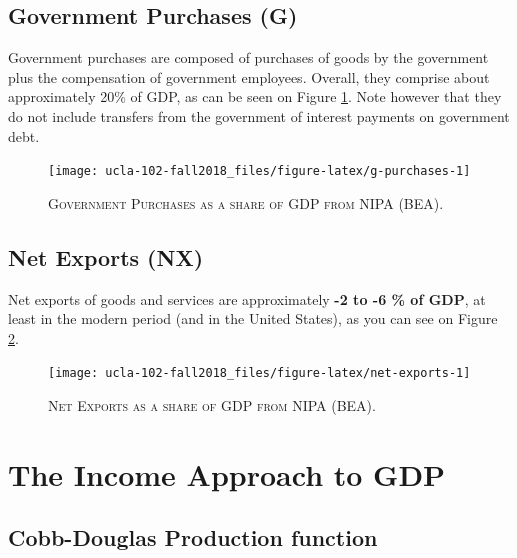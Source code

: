 \documentclass[]{book}
\theoremstyle{definition}
\theoremstyle{definition}
\theoremstyle{definition}
\theoremstyle{remark}
\begin{document}
\hypertarget{gov}{\subsection{Government Purchases (G)}\label{gov}}

Government purchases are composed of purchases of goods by the
government plus the compensation of government employees. Overall, they
comprise about approximately 20\% of GDP, as can be seen on Figure
\ref{fig:g-purchases}. Note however that they do not include transfers
from the government of interest payments on government debt.




\begin{figure}

{\centering \texttt{[image: ucla-102-fall2018\_files/figure-latex/g-purchases-1]} 

}

\caption{\textsc{Government Purchases as a share of GDP
from NIPA (BEA)}.}\label{fig:g-purchases}
\end{figure}

\hypertarget{net-exports}{\subsection{Net Exports
(NX)}\label{net-exports}}

Net exports of goods and services are approximately \textbf{-2 to -6 \%
of GDP}, at least in the modern period (and in the United States), as
you can see on Figure \ref{fig:net-exports}.




\begin{figure}

{\centering \texttt{[image: ucla-102-fall2018\_files/figure-latex/net-exports-1]} 

}

\caption{\textsc{Net Exports as a share of GDP from NIPA
(BEA)}.}\label{fig:net-exports}
\end{figure}

\hypertarget{gdp-income}{\section{The Income Approach to
GDP}\label{gdp-income}}

\subsection{Cobb-Douglas Production
function}\label{cobb-douglas-production-function}
\end{document}

